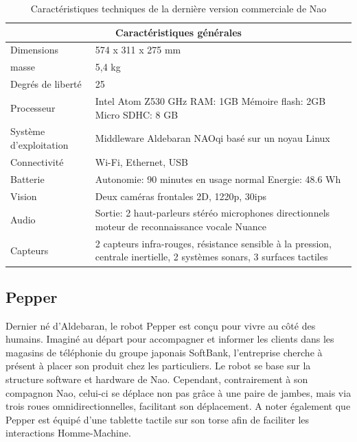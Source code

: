\begin{table}[h]
\begin{tabular}{ | l | p{8cm} | }
\hline
\multicolumn{2}{|c|}{Caractéristiques générales} \\
\hline
Dimensions & 574 x 311 x 275 mm \\
\hline 
masse & 5,4 kg \\
\hline 
Degrés de liberté  & 25 \\
\hline
Processeur & Intel Atom Z530 \newline 1.6 GHz \newline RAM: 1GB \newline Mémoire flash: 2GB  \newline Micro SDHC: 8 GB \\
\hline
Système d'exploitation & Middleware Aldebaran NAOqi basé sur un noyau Linux \\
\hline
Connectivité & Wi-Fi, Ethernet, USB \\
\hline
Batterie & Autonomie: 90 minutes en usage normal \newline Energie: 48.6 Wh \\
\hline 
Vision & Deux caméras frontales 2D, 1220p, 30ips \\
\hline
Audio & Sortie: 2 haut-parleurs stéréo \newline 4 microphones directionnels \newline moteur de reconnaissance vocale Nuance  \\
\hline
Capteurs & 2 capteurs infra-rouges, résistance sensible à la pression, centrale inertielle, 2 systèmes sonars, 3 surfaces tactiles \\
\hline
\end{tabular}
\caption[Caractéristiques technique de Nao]{Caractéristiques techniques de la dernière version commerciale  de Nao}
\label {tab: Caractéristiques technique de Nao}
\end{table}

\subsection{Pepper}
\label{Entreprise: Les produits: Pepper}
Dernier né d'Aldebaran, le robot Pepper est conçu pour vivre au côté des humains. Imaginé au départ pour accompagner et informer les clients dans les magasins de téléphonie du groupe japonais SoftBank, l'entreprise cherche à présent à placer son produit chez les particuliers. Le robot se base sur la structure software et hardware de Nao. Cependant, contrairement à son compagnon Nao, celui-ci se déplace non pas grâce à une paire de jambes, mais via trois roues omnidirectionnelles, facilitant son déplacement. A noter également que Pepper est équipé d'une tablette tactile sur son torse afin de faciliter les interactions Homme-Machine.

